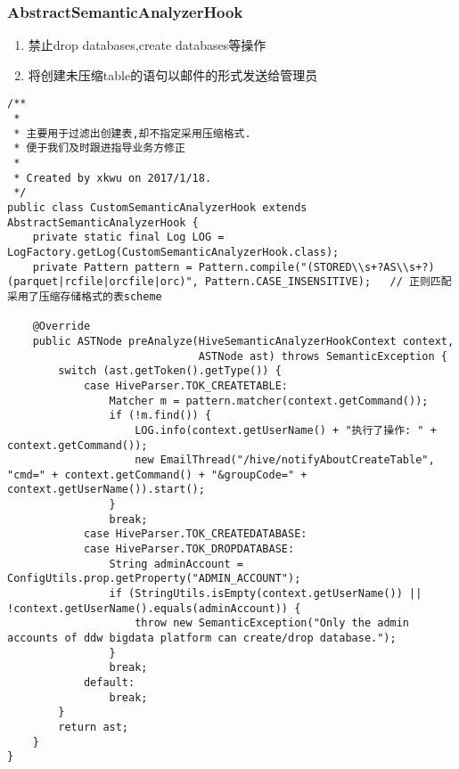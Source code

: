 \documentclass[11pt]{article}
\begin{document}
\subsubsection{AbstractSemanticAnalyzerHook}
\label{sec:org601522a}
\begin{enumerate}
\item 禁止drop databases,create databases等操作
\item 将创建未压缩table的语句以邮件的形式发送给管理员
\end{enumerate}
\begin{verbatim}
/**
 *
 * 主要用于过滤出创建表,却不指定采用压缩格式.
 * 便于我们及时跟进指导业务方修正
 *
 * Created by xkwu on 2017/1/18.
 */
public class CustomSemanticAnalyzerHook extends AbstractSemanticAnalyzerHook {
    private static final Log LOG = LogFactory.getLog(CustomSemanticAnalyzerHook.class);
    private Pattern pattern = Pattern.compile("(STORED\\s+?AS\\s+?)(parquet|rcfile|orcfile|orc)", Pattern.CASE_INSENSITIVE);   // 正则匹配采用了压缩存储格式的表scheme

    @Override
    public ASTNode preAnalyze(HiveSemanticAnalyzerHookContext context,
                              ASTNode ast) throws SemanticException {
        switch (ast.getToken().getType()) {
            case HiveParser.TOK_CREATETABLE:
                Matcher m = pattern.matcher(context.getCommand());
                if (!m.find()) {
                    LOG.info(context.getUserName() + "执行了操作: " + context.getCommand());
                    new EmailThread("/hive/notifyAboutCreateTable", "cmd=" + context.getCommand() + "&groupCode=" + context.getUserName()).start();
                }
                break;
            case HiveParser.TOK_CREATEDATABASE:
            case HiveParser.TOK_DROPDATABASE:
                String adminAccount = ConfigUtils.prop.getProperty("ADMIN_ACCOUNT");
                if (StringUtils.isEmpty(context.getUserName()) || !context.getUserName().equals(adminAccount)) {
                    throw new SemanticException("Only the admin accounts of ddw bigdata platform can create/drop database.");
                }
                break;
            default:
                break;
        }
        return ast;
    }
}
\end{verbatim}
\end{document}
